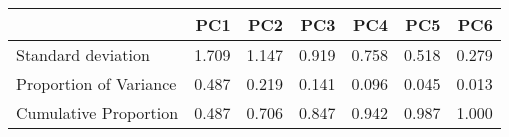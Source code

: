 \begin{tabular}{lrrrrrr}
\toprule
 & PC1 & PC2 & PC3 & PC4 & PC5 & PC6 \\ 
\midrule\addlinespace[2.5pt]
Standard deviation & 1.709 & 1.147 & 0.919 & 0.758 & 0.518 & 0.279 \\ 
Proportion of Variance & 0.487 & 0.219 & 0.141 & 0.096 & 0.045 & 0.013 \\ 
Cumulative Proportion & 0.487 & 0.706 & 0.847 & 0.942 & 0.987 & 1.000 \\ 
\bottomrule
\end{tabular}

